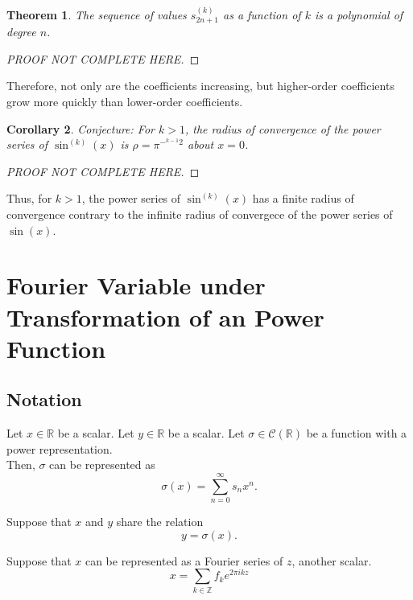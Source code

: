 \documentclass{article}
\newtheorem{theorem}{Theorem}
\newtheorem{corollary}[theorem]{Corollary}
\begin{document}
    \begin{theorem}
        The sequence of values $s_{2n+1}^{(k)}$ as a function of $k$ is a polynomial of degree $n$.
    \end{theorem}
    \begin{proof}
        [PROOF NOT COMPLETE HERE]
    \end{proof}

    Therefore, not only are the coefficients increasing, but higher-order coefficients grow more quickly than lower-order coefficients.

    \begin{corollary}
        Conjecture: For $k > 1$, the radius of convergence of the power series of $\sin^{(k)}(x)$ is $\rho = \pi^{-^{k-1}2}$ about $x = 0$.
    \end{corollary}
    \begin{proof}
        [PROOF NOT COMPLETE HERE]
    \end{proof}

    Thus, for $k > 1$, the power series of $\sin^{(k)}(x)$ has a finite radius of convergence contrary to the infinite radius of convergece of the power series of $\sin(x)$.

    \section{Fourier Variable under Transformation of an Power Function}

    \subsection{Notation}
    Let $x \in \mathbb{R}$ be a scalar. Let $y \in \mathbb{R}$ be a scalar. Let $\sigma \in \mathcal{C}(\mathbb{R})$ be a function with a power representation.\\

    Then, $\sigma$ can be represented as
    \begin{equation}
        \sigma(x) = \sum_{n=0}^{\infty} s_n x^n.
        \label{eqn2:sigma-analytic}
    \end{equation}

    Suppose that $x$ and $y$ share the relation
    \begin{equation}
        y = \sigma(x).
        \label{eqn2:xy-relation}
    \end{equation}

    Suppose that $x$ can be represented as a Fourier series of $z$, another scalar.
    \begin{equation}
        x = \sum_{k \in \mathbb{Z}} f_k e^{2\pi i k z}
        \label{eqn2:x-fourier}
    \end{equation}
\end{document}
